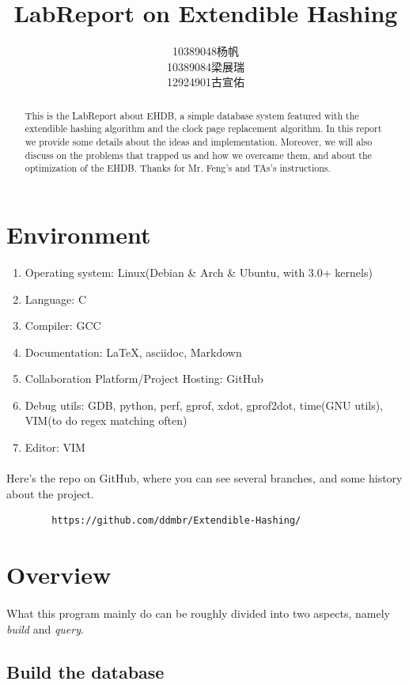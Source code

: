 \documentclass[a4paper, 12pt]{article}
\title{LabReport on Extendible Hashing}
\author{10389048杨帆 \\ 10389084梁展瑞 \\ 12924901古宣佑}
\begin{document}
\maketitle
\begin{abstract}
    This is the LabReport about EHDB, a simple database system featured with the extendible hashing algorithm and the clock page replacement algorithm. In this report we provide some details about the ideas and implementation. Moreover, we will also discuss on the problems that trapped us and how we overcame them, and about the optimization of the EHDB. Thanks for Mr. Feng's and TAs's instructions.
\end{abstract}
\section{Environment}
    \begin{enumerate}
        \item Operating system: Linux(Debian \& Arch \& Ubuntu, with 3.0+ kernels)
        \item Language: C
        \item Compiler: GCC
        \item Documentation: \LaTeX , asciidoc, Markdown
        \item Collaboration Platform/Project Hosting: GitHub
        \item Debug utils: GDB, python, perf, gprof, xdot, gprof2dot, time(GNU utils), VIM(to do regex matching often)
        \item Editor: VIM
    \end{enumerate}
    \paragraph{}
        Here's the repo on GitHub, where you can see several branches, and some history about the project.
    \begin{verbatim}
        https://github.com/ddmbr/Extendible-Hashing/
    \end{verbatim}
\section{Overview}
    \paragraph{}
        What this program mainly do can be roughly divided into two aspects, namely \emph{build} and \emph{query}.
    \subsection{Build the database}
\end{document}
